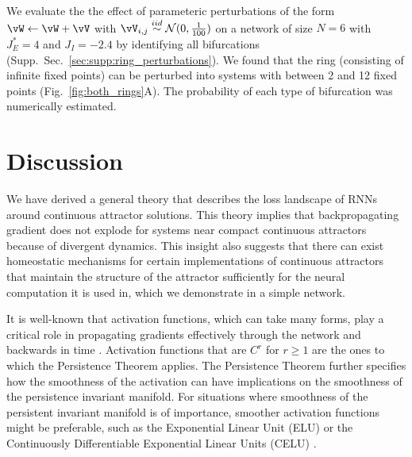 \documentclass{article} %
\newcounter{ct}
\newcommand{\iidsample}{\stackrel{iid}{\sim}}
\theoremstyle{definition}
\theoremstyle{remark}
\begin{document}
We evaluate the  the effect of parameteric perturbations of the form $ \vW \leftarrow \vW + \vV$ with $\vV_{i,j}\iidsample\mathcal{N}(0,\frac{1}{100})$ on a network of size $N = 6$ with $J_E^*= 4$ and $J_I=-2.4$ by identifying all bifurcations (Supp.~Sec.~\ref{sec:supp:ring_perturbations}).
We found that the ring (consisting of infinite fixed points) can be perturbed into systems with between 2 and 12 fixed points (Fig.~\ref{fig:both_rings}A).
The probability of each type of bifurcation was numerically estimated.


\section{Discussion}
We have derived a general theory that describes the loss landscape of RNNs around continuous attractor solutions.
This theory implies that backpropagating gradient does not explode for systems near compact continuous attractors because of divergent dynamics.
This insight also suggests that there can exist homeostatic mechanisms for certain implementations of continuous attractors that maintain the structure of the attractor sufficiently for the neural computation it is used in, which we demonstrate in a simple network. 

It is well-known that activation functions, which can take many forms, play a critical role in propagating gradients effectively through the network and backwards in time \citep{jagtap2023, ramachandran2017, hayou2019}.
Activation functions that are $C^r$ for $r\geq 1$ are the ones to which the Persistence Theorem applies. 
The Persistence Theorem further specifies how the smoothness of the activation can have implications on the smoothness of the persistence invariant manifold.
For situations where smoothness of the persistent invariant manifold is of importance, smoother activation functions might be preferable, such as the Exponential Linear Unit (ELU)\citep{clevert2015} or the Continuously Differentiable Exponential Linear Units (CELU) \citep{barron2017}.





%
%
\end{document}
